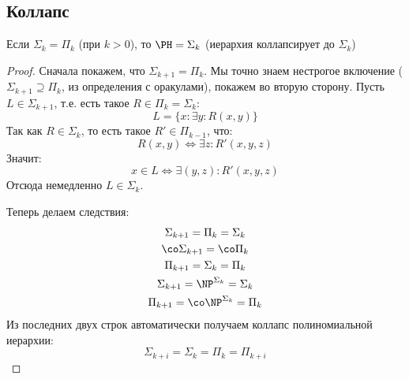 \subsection{Коллапс}
	\begin{theorem}
		Если $\Sigma_k=\Pi_k$ (при $k>0$), то $\PH=\Sigma_k$ (иерархия коллапсирует до $\Sigma_k$)
	\end{theorem}
	\begin{proof}
		Сначала покажем, что $\Sigma_{k+1} = \Pi_k$.
		Мы точно знаем нестрогое включение ($\Sigma_{k+1} \supseteq \Pi_k$, из определения с оракулами), покажем во вторую сторону.
		Пусть $L \in \Sigma_{k+1}$, т.е. есть такое $R \in \Pi_k=\Sigma_k$:
		\[ L = \{ x \colon \exists y \colon R(x, y) \} \]
		Так как $R \in \Sigma_k$, то есть такое $R' \in \Pi_{k-1}$, что:
		\[ R(x, y) \iff \exists z \colon R'(x, y, z) \]
		Значит:
		\[ x \in L \iff \exists (y, z) \colon R'(x, y, z) \]
		Отсюда немедленно $L \in \Sigma_k$.

		Теперь делаем следствия:
		\begin{gather*}
			\Sigma_{k+1} = \Pi_k = \Sigma_k \\
			\co\Sigma_{k+1} = \co\Pi_k \\
			\Pi_{k+1} = \Sigma_k = \Pi_k \\
			\Sigma_{k+1} = \NP^{\Sigma_k} = \Sigma_k \\
			\Pi_{k+1} = \co\NP^{\Sigma_k} = \Pi_k
		\end{gather*}
		Из последних двух строк автоматически получаем коллапс полиномиальной иерархии:
		\[ \Sigma_{k+i} = \Sigma_k = \Pi_k = \Pi_{k+i} \]
	\end{proof}
